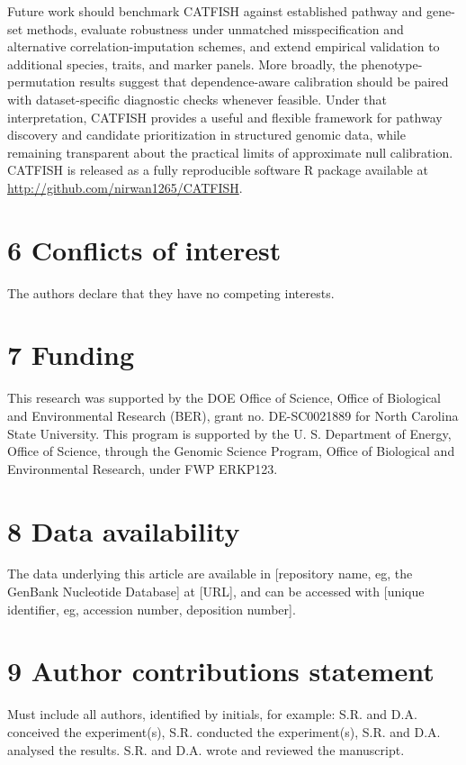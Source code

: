 \documentclass[unnumsec,webpdf,contemporary,large]{oup-authoring-template}%
\theoremstyle{thmstyleone}%
\theoremstyle{thmstyletwo}%
\theoremstyle{thmstylethree}%
\begin{document}
Future work should benchmark CATFISH against established pathway and gene-set methods, evaluate robustness under unmatched misspecification and alternative correlation-imputation schemes, and extend empirical validation to additional species, traits, and marker panels. More broadly, the phenotype-permutation results suggest that dependence-aware calibration should be paired with dataset-specific diagnostic checks whenever feasible. Under that interpretation, CATFISH provides a useful and flexible framework for pathway discovery and candidate prioritization in structured genomic data, while remaining transparent about the practical limits of approximate null calibration. CATFISH is released as a fully reproducible software R package available at \url{http://github.com/nirwan1265/CATFISH}.


\section{6 Conflicts of interest}
The authors declare that they have no competing interests.

\section{7 Funding}
This research was supported by the DOE Office of Science, Office of Biological and Environmental Research (BER), grant no. DE-SC0021889 for North Carolina State University. This program is supported by the U. S. Department of Energy, Office of Science, through the Genomic Science Program, Office of Biological and Environmental Research, under FWP ERKP123.

\section{8 Data availability}
The data underlying this article are available in [repository name, eg, the GenBank Nucleotide Database] at [URL], and can be accessed with [unique identifier, eg, accession number, deposition number].

\section{9 Author contributions statement}

Must include all authors, identified by initials, for example:
S.R. and D.A. conceived the experiment(s),  S.R. conducted the experiment(s), S.R. and D.A. analysed the results.  S.R. and D.A. wrote and reviewed the manuscript.
\end{document}
